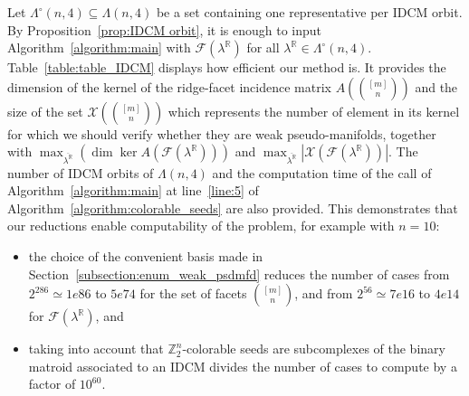 \documentclass[11pt]{amsart}
\theoremstyle{plain}
\numberwithin{equation}{section}
\theoremstyle{definition}
\newcommand{\cF}{\mathcal{F}}
\newcommand{\cX}{\mathcal{X}}
\newcommand{\R}{\mathbb{R}}
\newcommand{\Z}{\mathbb{Z}}
\begin{document}
Let $\Lambda^\circ(n,4)\subseteq \Lambda(n,4)$ be a set containing one representative per IDCM orbit.
By Proposition~\ref{prop:IDCM orbit}, it is enough to input Algorithm~\ref{algorithm:main} with $\cF(\lambda^\R)$ for all $\lambda^\R\in\Lambda^\circ(n,4)$.
Table~\ref{table:table_IDCM} displays how efficient our method is.
It provides the dimension of the kernel of  the ridge-facet incidence matrix $A\left(\binom{[m]}{n}\right)$ and the size of the set $\cX\left(\binom{[m]}{n}\right)$ which represents the number of element in its kernel for which we should verify whether they are weak pseudo-manifolds, together with $\max_{\overline{\lambda^\R}}(\dim\ker A(\cF(\lambda^\R)))$ and $\max_{\overline{\lambda^\R}} |\cX(\cF(\lambda^\R))|$.
The number of IDCM orbits of $\Lambda(n,4)$ and the computation time of the call of Algorithm~\ref{algorithm:main} at line~\ref{line:5} of Algorithm~\ref{algorithm:colorable_seeds} are also provided.
This demonstrates that our reductions enable computability of the problem, for example with $n=10$:
\begin{itemize}
	\item the choice of the convenient basis made in Section~\ref{subsection:enum_weak_psdmfd} reduces the number of cases from $2^{286}\simeq 1e86$ to $5e74$ for the set of facets $\binom{[m]}{n}$, and from $2^{56}\simeq 7e16$ to $4e14$ for  $\cF(\lambda^\R)$, and
	\item taking into account that $\Z_2^n$-colorable seeds are subcomplexes of the binary matroid associated to an IDCM divides the number of cases to compute by a factor of $10^{60}$.
\end{itemize}
 
\end{document}
